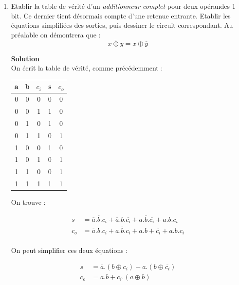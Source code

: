 \documentclass[a4paper,11pt]{article}
\begin{document}
\begin{enumerate}
\item Etablir la table de vérité d'un {\it additionneur complet} pour deux opérandes 1 bit. Ce dernier tient désormais compte d'une retenue entrante. Etablir les équations simplifiées des sorties, puis dessiner le circuit correspondant. Au préalable on démontrera que :
$$\overline{x\oplus y}=x \oplus \overline{y}$$

\begin{cadre}
{\bf Solution}\\
On écrit la table de vérité, comme précédemment :\\
\begin{tabular}{|c|c|c||c|c|}
  \hline
  a & b & $c_i$ & s & $c_o$  \\ \hline
  0 & 0 & 0 & 0 & 0 \\ \hline
  0 & 0 & 1 & 1 & 0 \\ \hline
  0 & 1 & 0 & 1 & 0 \\ \hline
  0 & 1 & 1 & 0 & 1 \\ \hline
  1 & 0 & 0 & 1 & 0 \\ \hline
  1 & 0 & 1 & 0 & 1 \\ \hline
  1 & 1 & 0 & 0 & 1 \\ \hline
  1 & 1 & 1 & 1 & 1 \\ \hline
\end{tabular}
On trouve :

\begin{align*}
  s &= \overline{a} . \overline{b} . c_i  +  \overline{a} . b . \overline{c_i}  +  a . \overline{b} . \overline{c_i}  +  a . b . c_i \\
  c_o &= \overline{a} . b . c_i  +  a . \overline{b} . c_i  +  a . b  +  \overline{c_i}  +  a . b . c_i \\
\end{align*}

On peut simplifier ces deux équations :

\begin{align*}
  s &= \overline{a}.(b \oplus c_i) + a.(b \oplus \overline{c_i}) \\
  c_o &= a.b+c_i.(a \oplus b)\\
\end{align*}


\end{cadre}
\end{enumerate}
\end{document}
